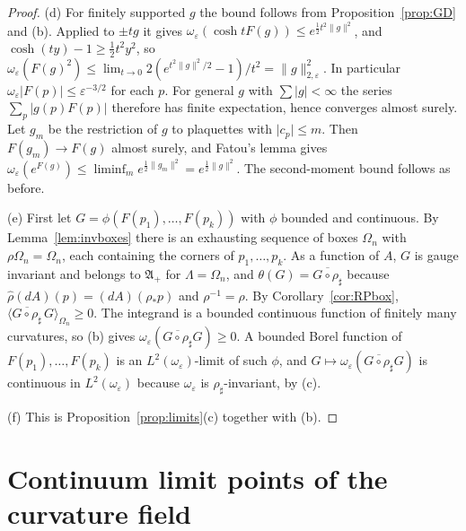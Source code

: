 \documentclass[11pt]{amsart}
\theoremstyle{plain}
\theoremstyle{definition}
\theoremstyle{remark}
\numberwithin{equation}{section}
\newcommand{\eps}{\varepsilon}
\newcommand{\fA}{\mathfrak{A}}
\newcommand{\abs}[1]{\lvert #1\rvert}
\newcommand{\norm}[1]{\lVert #1\rVert}
\newcommand{\ev}[1]{\langle #1\rangle}
\begin{document}
\begin{proof}
(d) For finitely supported $g$ the bound follows from Proposition~\ref{prop:GD} and (b). Applied to $\pm tg$ it gives $\omega_\eps(\cosh tF(g))\le e^{\frac12t^2\norm g^2}$, and $\cosh(ty)-1\ge\frac12t^2y^2$, so $\omega_\eps(F(g)^2)\le\lim_{t\to0}2(e^{t^2\norm g^2/2}-1)/t^2=\norm g^2_{2,\eps}$. In particular $\omega_\eps\abs{F(p)}\le\eps^{-3/2}$ for each $p$. For general $g$ with $\sum\abs g<\infty$ the series $\sum_p\abs{g(p)F(p)}$ therefore has finite expectation, hence converges almost surely. Let $g_m$ be the restriction of $g$ to plaquettes with $\abs{c_p}\le m$. Then $F(g_m)\to F(g)$ almost surely, and Fatou's lemma gives $\omega_\eps(e^{F(g)})\le\liminf_me^{\frac12\norm{g_m}^2}=e^{\frac12\norm g^2}$. The second-moment bound follows as before.

(e) First let $G=\phi(F(p_1),\dots,F(p_k))$ with $\phi$ bounded and continuous. By Lemma~\ref{lem:invboxes} there is an exhausting sequence of boxes $\Omega_n$ with $\rho\Omega_n=\Omega_n$, each containing the corners of $p_1,\dots,p_k$. As a function of $A$, $G$ is gauge invariant and belongs to $\fA_+$ for $\Lambda=\Omega_n$, and $\theta(G)=\overline{G\circ\rho_\sharp}$ because $\hat\rho(dA)(p)=(dA)(\rho_*p)$ and $\rho^{-1}=\rho$. By Corollary~\ref{cor:RPbox}, $\ev{\overline{G\circ\rho_\sharp}\,G}_{\Omega_n}\ge0$. The integrand is a bounded continuous function of finitely many curvatures, so (b) gives $\omega_\eps(\overline{G\circ\rho_\sharp}G)\ge0$. A bounded Borel function of $F(p_1),\dots,F(p_k)$ is an $L^2(\omega_\eps)$-limit of such $\phi$, and $G\mapsto\omega_\eps(\overline{G\circ\rho_\sharp}G)$ is continuous in $L^2(\omega_\eps)$ because $\omega_\eps$ is $\rho_\sharp$-invariant, by (c).

(f) This is Proposition~\ref{prop:limits}(c) together with (b).
\end{proof}

\section{Continuum limit points of the curvature field}\label{sec:cont}
\end{document}
